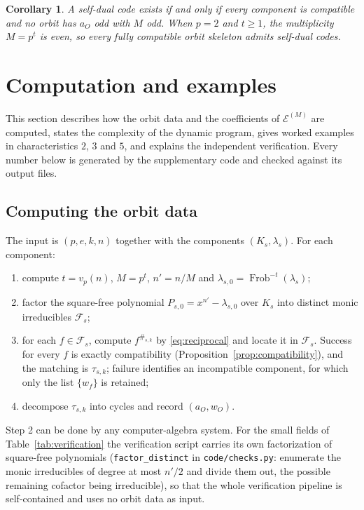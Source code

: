 \documentclass[11pt,a4paper]{article}
\newcommand{\Fs}{\mathcal F_s}
\newcommand{\Epoly}{\mathscr E}
\newcommand{\Frob}{\operatorname{Frob}}
\numberwithin{equation}{section}
\theoremstyle{plain}
\newtheorem{corollary}[theorem]{Corollary}
\theoremstyle{definition}
\theoremstyle{remark}
\begin{document}
\begin{corollary}\label{cor:self-dual}
A self-dual code exists if and only if every component is compatible and no
orbit has $a_O$ odd with $M$ odd.  When $p=2$ and $t\geq1$, the multiplicity
$M=p^t$ is even, so every fully compatible orbit skeleton admits self-dual
codes.
\end{corollary}

\section{Computation and examples}\label{sec:examples}

This section describes how the orbit data and the coefficients of
$\Epoly^{(M)}$ are computed, states the complexity of the dynamic program,
gives worked examples in characteristics $2$, $3$ and $5$, and explains the
independent verification.  Every number below is generated by the
supplementary code and checked against its output files.

\subsection{Computing the orbit data}\label{sec:orbit-data}

The input is $(p,e,k,n)$ together with the components $(K_s,\lambda_s)$.
For each component:
\begin{enumerate}
\item compute $t=v_p(n)$, $M=p^t$, $n'=n/M$ and
  $\lambda_{s,0}=\Frob^{-t}(\lambda_s)$;
\item factor the square-free polynomial $P_{s,0}=x^{n'}-\lambda_{s,0}$ over
  $K_s$ into distinct monic irreducibles $\Fs$;
\item for each $f\in\Fs$, compute $f^{\#_{s,k}}$ by \eqref{eq:reciprocal} and
  locate it in $\Fs$.  Success for every $f$ is exactly compatibility
  (Proposition~\ref{prop:compatibility}), and the matching is $\tau_{s,k}$;
  failure identifies an incompatible component, for which only the list
  $\{w_f\}$ is retained;
\item decompose $\tau_{s,k}$ into cycles and record $(a_O,w_O)$.
\end{enumerate}
Step 2 can be done by any computer-algebra system.  For the small fields of
Table~\ref{tab:verification} the verification script carries its own
factorization of square-free polynomials (\texttt{factor\_distinct} in
\texttt{code/checks.py}: enumerate the monic irreducibles of degree at most
$n'/2$ and divide them out, the possible remaining cofactor being
irreducible), so that the whole verification pipeline is self-contained and
uses no orbit data as input.
\end{document}
